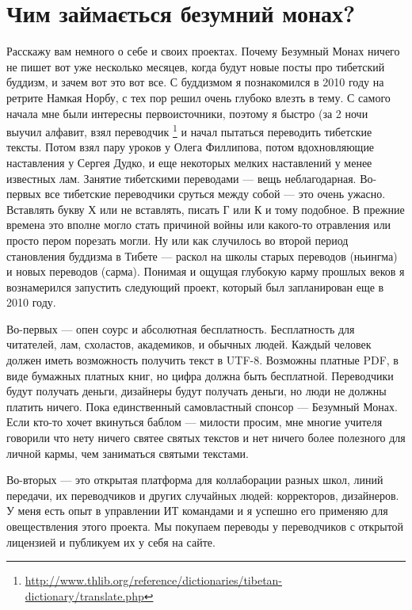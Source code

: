 \section{Чим займається безумний монах?}

Расскажу вам немного о себе и своих проектах.
Почему Безумный Монах ничего не пишет вот уже
несколько месяцев, когда будут новые посты про
тибетский буддизм, и зачем вот это вот все. С
буддизмом я познакомился в 2010 году на ретрите
Намкая Норбу, с тех пор решил очень глубоко влезть в тему.
С самого начала мне были интересны первоисточники,
поэтому я быстро (за 2 ночи выучил алфавит, взял
переводчик \footnote{\url{http://www.thlib.org/reference/dictionaries/tibetan-dictionary/translate.php}}
и начал пытаться переводить тибетские тексты.
Потом взял пару уроков у Олега Филлипова, потом
вдохновляющие наставления у Сергея Дудко, и еще
некоторых мелких наставлений у менее известных лам.
Занятие тибетскими переводами --- вещь неблагодарная.
Во-первых все тибетские переводчики сруться между
собой --- это очень ужасно. Вставлять букву Х или
не вставлять, писать Г или К и тому подобное.
В прежние времена это вполне могло стать причиной
войны или какого-то отравления или просто пером
порезать могли. Ну или как случилось во второй
период становления буддизма в Тибете --- раскол
на школы старых переводов (ньингма) и новых
переводов (сарма). Понимая и ощущая глубокую
карму прошлых веков я вознамерился запустить
следующий проект, который был запланирован еще в 2010 году.

Во-первых — опен соурс и абсолютная бесплатность.
Бесплатность для читателей, лам, схоластов, академиков,
и обычных людей. Каждый человек должен иметь возможность
получить текст в UTF-8. Возможны платные PDF, в виде
бумажных платных книг, но цифра должна быть бесплатной.
Переводчики будут получать деньги, дизайнеры будут
получать деньги, но люди не должны платить ничего.
Пока единственный самовластный спонсор --- Безумный Монах.
Если кто-то хочет вкинуться баблом --- милости просим,
мне многие учителя говорили что нету ничего святее
святых текстов и нет ничего более полезного для личной
кармы, чем заниматься святыми текстами.

Во-вторых — это открытая платформа для коллаборации разных школ, линий передачи, их переводчиков и других случайных людей: корректоров, дизайнеров. У меня есть опыт в управлении ИТ командами и я успешно его применяю для овеществления этого проекта. Мы покупаем переводы у переводчиков с открытой лицензией и публикуем их у себя на сайте.

